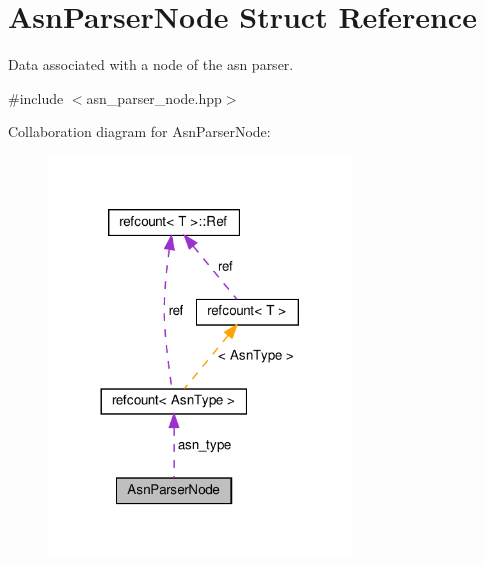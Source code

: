 \hypertarget{structAsnParserNode}{}\section{Asn\+Parser\+Node Struct Reference}
\label{structAsnParserNode}


Data associated with a node of the asn parser.  




{\ttfamily \#include $<$asn\+\_\+parser\+\_\+node.\+hpp$>$}



Collaboration diagram for Asn\+Parser\+Node\+:
\nopagebreak
\begin{figure}[H]
\begin{center}
\leavevmode
\includegraphics[width=228pt]{d3/d16/structAsnParserNode__coll__graph}
\end{center}
\end{figure}

